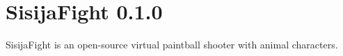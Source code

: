 \chapter{Sisija\+Fight 0.1.0}
\hypertarget{index}{}\label{index}
Sisija\+Fight is an open-\/source virtual paintball shooter with animal characters. 